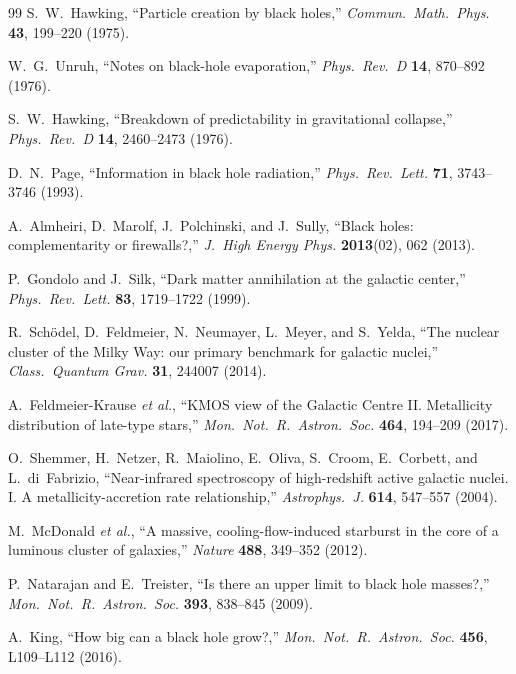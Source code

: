 \documentclass[11pt,a4paper]{article}
\theoremstyle{plain}
\theoremstyle{definition}
\theoremstyle{remark}
\numberwithin{equation}{section}
\begin{document}
\begin{thebibliography}{99}
S.~W.~Hawking, ``Particle creation by black holes,'' \textit{Commun.\ Math.\ Phys.} \textbf{43}, 199--220 (1975).

W.~G.~Unruh, ``Notes on black-hole evaporation,'' \textit{Phys.\ Rev.\ D} \textbf{14}, 870--892 (1976).

S.~W.~Hawking, ``Breakdown of predictability in gravitational collapse,'' \textit{Phys.\ Rev.\ D} \textbf{14}, 2460--2473 (1976).

D.~N.~Page, ``Information in black hole radiation,'' \textit{Phys.\ Rev.\ Lett.} \textbf{71}, 3743--3746 (1993).

A.~Almheiri, D.~Marolf, J.~Polchinski, and J.~Sully, ``Black holes: complementarity or firewalls?,'' \textit{J.\ High Energy Phys.} \textbf{2013}(02), 062 (2013).

P.~Gondolo and J.~Silk, ``Dark matter annihilation at the galactic center,'' \textit{Phys.\ Rev.\ Lett.} \textbf{83}, 1719--1722 (1999).

R.~Sch\"odel, D.~Feldmeier, N.~Neumayer, L.~Meyer, and S.~Yelda, ``The nuclear cluster of the Milky Way: our primary benchmark for galactic nuclei,'' \textit{Class.\ Quantum Grav.} \textbf{31}, 244007 (2014).

A.~Feldmeier-Krause \textit{et al.}, ``KMOS view of the Galactic Centre II. Metallicity distribution of late-type stars,'' \textit{Mon.\ Not.\ R.\ Astron.\ Soc.} \textbf{464}, 194--209 (2017).

O.~Shemmer, H.~Netzer, R.~Maiolino, E.~Oliva, S.~Croom, E.~Corbett, and L.~di~Fabrizio, ``Near-infrared spectroscopy of high-redshift active galactic nuclei. I. A metallicity-accretion rate relationship,'' \textit{Astrophys.\ J.} \textbf{614}, 547--557 (2004).

M.~McDonald \textit{et al.}, ``A massive, cooling-flow-induced starburst in the core of a luminous cluster of galaxies,'' \textit{Nature} \textbf{488}, 349--352 (2012).

P.~Natarajan and E.~Treister, ``Is there an upper limit to black hole masses?,'' \textit{Mon.\ Not.\ R.\ Astron.\ Soc.} \textbf{393}, 838--845 (2009).

A.~King, ``How big can a black hole grow?,'' \textit{Mon.\ Not.\ R.\ Astron.\ Soc.} \textbf{456}, L109--L112 (2016).


\end{thebibliography}
\end{document}

